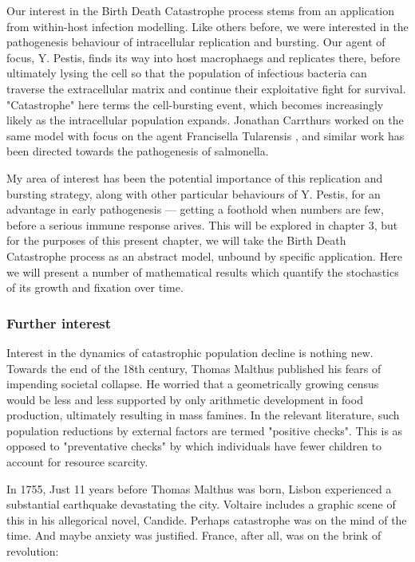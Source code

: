 Our interest in the Birth Death Catastrophe process stems from an application from within-host infection modelling. Like others before, we were interested in the pathogenesis behaviour of intracellular replication and bursting. Our agent of focus, Y. Pestis,
finds its way into host macrophaegs and replicates there, before ultimately lysing the cell so that the population of
infectious bacteria can traverse the extracellular matrix and continue their exploitative fight for survival.
"Catastrophe" here terms the cell-bursting event, which becomes increasingly likely as the intracellular population expands. 
Jonathan Carrthurs worked on the same model with focus on the agent Francisella Tularensis \cite{carruthers2020stochastic} \cite{karlin1957classification} \cite{karlin1982linear} \cite{di2008note}
, and similar work has
been directed towards the pathogenesis of salmonella.\par
My area of interest has been the potential importance of this replication and bursting strategy, along with other particular
behaviours of Y. Pestis, for an advantage in early pathogenesis --- getting a foothold when numbers are few, before a
serious immune response arives. This will be explored in chapter 3, but for the purposes of this present chapter, we will take the Birth Death Catastrophe process
as an abstract model, unbound by specific application. Here we will present a number of mathematical results which
quantify the stochastics of its growth and fixation over time.\par
\vspace{5pt}



\subsubsection*{Further interest}
Interest in the dynamics of catastrophic population decline is nothing new. Towards the end of the 18th century, 
Thomas Malthus published his fears of impending societal collapse. He worried that a geometrically growing
census would be less and less supported by only arithmetic development in food production, ultimately resulting in mass
famines. In the relevant literature, such population reductions by external factors are termed "positive checks".
This is as opposed to "preventative checks" by which individuals have fewer children to account for resource scarcity.

In 1755, Just 11 years before Thomas Malthus was born, Lisbon experienced a substantial earthquake devastating the city.
Voltaire includes a graphic scene of this in his allegorical novel, Candide. Perhaps catastrophe was on the mind of the time.
And maybe anxiety was justified. France, after all, was on the brink of revolution: 

